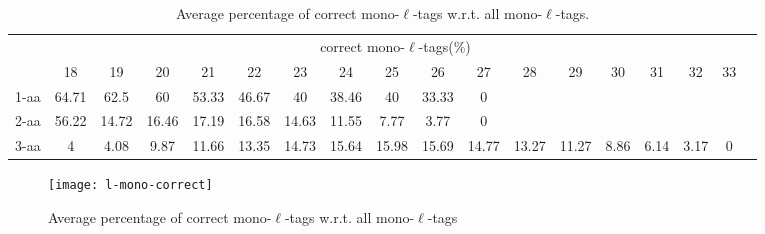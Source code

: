 \documentclass{article}[12pt]
\begin{document}
\begin{landscape}
\begin{table}[h]
\vspace{3mm}
\end{table}
\begin{table}[h]\tiny
\vspace{3mm}
{\centering
\begin{center}
\begin{tabular}{|l|c|c|c|c|c|c|c|c|c|c|c|c|c|c|c|c|c|}
  \hline
  & \multicolumn{ 16 }{|c|}{correct mono-$\ell$-tags(\%)} \\
  \cline{2- 17}
    & 18 & 19 & 20 & 21 & 22 & 23 & 24 & 25 & 26 & 27 & 28 & 29 & 30 & 31 & 32 & 33\\
  \hline
1-aa  & 64.71 & 62.5 & 60 & 53.33 & 46.67 & 40 & 38.46 & 40 & 33.33 & 0 &  &  &  &  &  & \\
2-aa  & 56.22 & 14.72 & 16.46 & 17.19 & 16.58 & 14.63 & 11.55 & 7.77 & 3.77 & 0 &  &  &  &  &  & \\
3-aa  & 4 & 4.08 & 9.87 & 11.66 & 13.35 & 14.73 & 15.64 & 15.98 & 15.69 & 14.77 & 13.27 & 11.27 & 8.86 & 6.14 & 3.17 & 0\\
 \hline
\end{tabular}
\end{center}
\par}
\centering

\caption{ Average percentage of correct mono-$\ell$-tags w.r.t. all mono-$\ell$-tags.}
\label{table:l-mono-correct}

\vspace{3mm}
\end{table}
\end{landscape}

\begin{figure}
  \begin{center}
\texttt{[image: l-mono-correct]}
\end{center}
\caption{Average percentage of correct mono-$\ell$-tags w.r.t. all mono-$\ell$-tags}
  \label{fig:l-mono-correct}
\end{figure}


\end{document}
